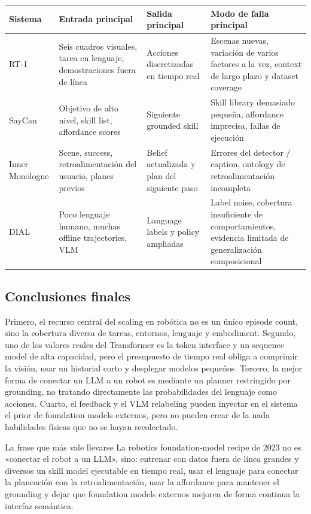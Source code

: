 \documentclass[a4paper]{article}
\begin{document}
\begin{longtable}{@{}L{0.16\textwidth}L{0.22\textwidth}L{0.23\textwidth}L{0.27\textwidth}@{}}
\toprule
Sistema & Entrada principal & Salida principal & Modo de falla principal \\
\midrule
RT-1 & Seis cuadros visuales, tarea en lenguaje, demostraciones fuera de línea & Acciones discretizadas en tiempo real & Escenas nuevas, variación de varios factores a la vez, context de largo plazo y dataset coverage \\
SayCan & Objetivo de alto nivel, skill list, affordance scores & Siguiente grounded skill & Skill library demasiado pequeña, affordance imprecisa, fallas de ejecución \\
Inner Monologue & Scene, success, retroalimentación del usuario, planes previos & Belief actualizada y plan del siguiente paso & Errores del detector / caption, ontology de retroalimentación incompleta \\
DIAL & Poco lenguaje humano, muchas offline trajectories, VLM & Language labels y policy ampliadas & Label noise, cobertura insuficiente de comportamientos, evidencia limitada de generalización composicional \\
\bottomrule
\end{longtable}

\subsection{Conclusiones finales}

Primero, el recurso central del scaling en robótica no es un único episode count, sino la cobertura diversa de tareas, entornos, lenguaje y embodiment. Segundo, uno de los valores reales del Transformer es la token interface y un sequence model de alta capacidad, pero el presupuesto de tiempo real obliga a comprimir la visión, usar un historial corto y desplegar modelos pequeños. Tercero, la mejor forma de conectar un LLM a un robot es mediante un planner restringido por grounding, no tratando directamente las probabilidades del lenguaje como acciones. Cuarto, el feedback y el VLM relabeling pueden inyectar en el sistema el prior de foundation models externos, pero no pueden crear de la nada habilidades físicas que no se hayan recolectado.

\begin{importantbox}{La frase que más vale llevarse}
La robotics foundation-model recipe de 2023 no es «conectar el robot a un LLM», sino: entrenar con datos fuera de línea grandes y diversos un skill model ejecutable en tiempo real, usar el lenguaje para conectar la planeación con la retroalimentación, usar la affordance para mantener el grounding y dejar que foundation models externos mejoren de forma continua la interfaz semántica.
\end{importantbox}
\end{document}

